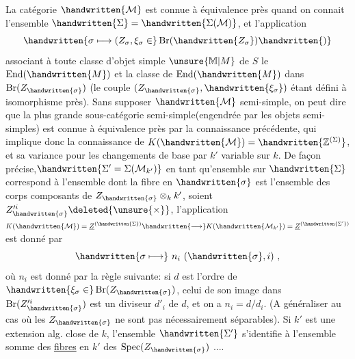  La catégorie $\handwritten{\mathcal{M}}$ est connue à équivalence près quand on connait l'ensemble $\handwritten{\Sigma}=\handwritten{\Sigma(\mathcal{M})}$, et l'application
\[
\handwritten{\sigma\longmapsto (Z_\sigma,\xi_\sigma\in}\operatorname{Br}(\handwritten{Z_\sigma})\handwritten{)}
\]
associant à toute classe\inserted{\handwritten{$\sigma$}} d'objet simple $\unsure{\mathbb{M}|M}$ de $S$ le  $\operatorname{End}(\handwritten{M})$
et la classe de $\operatorname{End}(\handwritten{M})$ dans $\operatorname{Br}(Z_{\handwritten{\sigma}})$ (le couple $(Z_{\handwritten{\sigma}},\handwritten{\xi_\sigma})$ étant défini à isomorphisme près). Sans supposer $\handwritten{\mathcal{M}}$ semi\handwritten{\unsure{(}}-simple, on peut dire que la plus grande sous-catégorie semi-simple(engendrée par les objets semi-simples) est connue à équivalence près par la connaissance précédente, qui implique donc la connaissance de $K(\handwritten{\mathcal{M}})=\handwritten{\mathbb{Z}^{(\Sigma)}}$, et sa variance pour les changements de base par $k'$ variable sur $k$. De façon précise,$\handwritten{\Sigma'=\Sigma(\mathcal{M}_{k'})}$ en tant qu'ensemble sur $\handwritten{\Sigma}$ correspond à l'ensemble  dont la fibre  en $\handwritten{\sigma}$ est l'ensemble des corps composants de $Z_{\handwritten{\sigma}}\otimes_k k'$, soient $Z'^{i}_{\handwritten{\sigma}}\deleted{\unsure{\times}}$, l'application $K(\handwritten{\mathcal{M}})=\underline{Z}^{(\handwritten{\Sigma})}\handwritten{\longrightarrow}K(\handwritten{\mathcal{M}_{k'}})=\underline{Z}^{(\handwritten{\Sigma'})}$ est donné par
\[
\handwritten{\sigma\longmapsto}\ n_i\ (\handwritten{\sigma},i)\ ,
\]
où $n_i$ est donné par la règle suivante: si $d$ est  l'ordre de $\handwritten{\xi_\sigma\in}\operatorname{Br}(Z_{\handwritten{\sigma}})$, celui de son image dans $\operatorname{Br}(Z'^{i}_{\handwritten{\sigma}})$ est un  diviseur $d'_i$ de $d$, et on a $n_i=d/d_i$. (A généraliser au cas où les $Z_{\handwritten{\sigma}}$ ne sont pas nécessairement séparables). Si $k'$ est une  extension alg. close de $k$, l'ensemble $\handwritten{\Sigma'}$ s'identifie à l'ensemble somme des \uline{fibres} en $k'$ des $\operatorname{Spec}(Z_{\handwritten{\sigma}})$ ....

